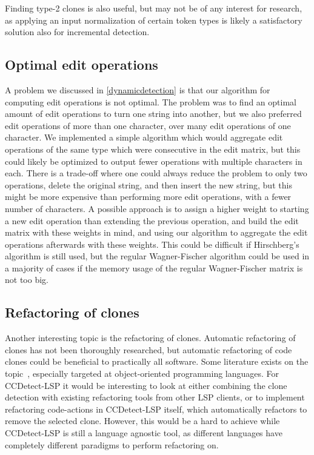 Finding type-2 clones is also useful, but may not be of any interest for research, as
applying an input normalization of certain token types is likely a satisfactory solution
also for incremental detection.

\subsection*{Optimal edit operations}

A problem we discussed in \cref{dynamicdetection} is that our algorithm for computing edit
operations is not optimal. The problem was to find an optimal amount of edit operations to
turn one string into another, but we also preferred edit operations of more than one
character, over many edit operations of one character. We implemented a simple algorithm
which would aggregate edit operations of the same type which were consecutive in the edit
matrix, but this could likely be optimized to output fewer operations with multiple
characters in each. There is a trade-off where one could always reduce the problem to only
two operations, delete the original string, and then insert the new string, but this might
be more expensive than performing more edit operations, with a fewer number of characters.
A possible approach is to assign a higher weight to starting a new edit operation than
extending the previous operation, and build the edit matrix with these weights in mind,
and using our algorithm to aggregate the edit operations afterwards with these weights.
This could be difficult if Hirschberg's algorithm is still used, but the regular
Wagner-Fischer algorithm could be used in a majority of cases if the memory usage of the
regular Wagner-Fischer matrix is not too big.

\subsection*{Refactoring of clones}

Another interesting topic is the refactoring of clones. Automatic refactoring of clones
has not been thoroughly researched, but automatic refactoring of code clones could be
beneficial to practically all software. Some literature exists on the
topic~\cite{TowardsAutomatedRefactoring, RefactoringOrientedClones}, especially targeted
at object-oriented programming languages. For CCDetect-LSP it would be interesting to look
at either combining the clone detection with existing refactoring tools from other LSP
clients, or to implement refactoring code-actions in CCDetect-LSP itself, which
automatically refactors to remove the selected clone. However, this would be a hard to
achieve while CCDetect-LSP is still a language agnostic tool, as different languages have
completely different paradigms to perform refactoring on.


